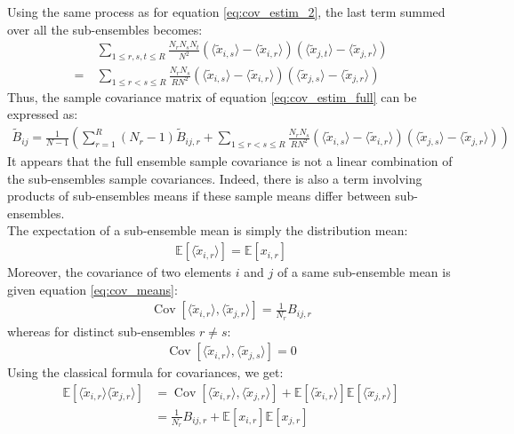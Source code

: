 \documentclass[12pt]{scrartcl}
\DeclareMathOperator{\Cov}{Cov}
\begin{document}
Using the same process as for equation \eqref{eq:cov_estim_2}, the last term summed over all the sub-ensembles becomes:
\begin{align}
& \sum_{1 \le r,s,t \le R} \frac{N_r N_s N_t}{N^2} \left(\langle \widetilde{x}_{i,s} \rangle - \langle \widetilde{x}_{i,r} \rangle \right) \left(\langle \widetilde{x}_{j,t} \rangle - \langle \widetilde{x}_{j,r} \rangle \right) \nonumber \\
= \ & \sum_{1 \le r < s \le R} \frac{N_r N_s}{R N^2} \left(\langle \widetilde{x}_{i,s} \rangle - \langle \widetilde{x}_{i,r} \rangle \right) \left(\langle \widetilde{x}_{j,s} \rangle - \langle \widetilde{x}_{j,r} \rangle \right)
\end{align}
Thus, the sample covariance matrix of equation \eqref{eq:cov_estim_full} can be expressed as:
\begin{align}
\widetilde{B}_{ij} =  \frac{1}{N-1} \left(\sum_{r=1}^R \left(N_r-1\right) \widetilde{B}_{ij,r} + \sum_{1 \le r < s \le R} \frac{N_r N_s}{R N^2} \left(\langle \widetilde{x}_{i,s} \rangle - \langle \widetilde{x}_{i,r} \rangle \right) \left(\langle \widetilde{x}_{j,s} \rangle - \langle \widetilde{x}_{j,r} \rangle \right) \right)
\end{align}
It appears that the full ensemble sample covariance is not a linear combination of the sub-ensembles sample covariances. Indeed, there is also a term involving products of sub-ensembles means if these sample means differ between sub-ensembles.\\
$  $\\
The expectation of a sub-ensemble mean is simply the distribution mean:
\begin{align}
\mathbb{E} \left[\langle \widetilde{x}_{i,r} \rangle \right] = \mathbb{E} \left[x_{i,r} \right]
\end{align}
Moreover, the covariance of two elements $i$ and $j$ of a same sub-ensemble mean is given equation \ref{eq:cov_means}:
\begin{align}
\Cov \left[\langle \widetilde{x}_{i,r} \rangle,\langle \widetilde{x}_{j,r} \rangle \right] = \frac{1}{N_r} B_{ij,r}
\end{align}
whereas for distinct sub-ensembles $r \ne s$:
\begin{align}
\Cov \left[\langle \widetilde{x}_{i,r} \rangle,\langle \widetilde{x}_{j,s} \rangle \right] = 0
\end{align}
Using the classical formula for covariances, we get:
\begin{align}
\mathbb{E} \left[\langle \widetilde{x}_{i,r} \rangle \langle \widetilde{x}_{j,r} \rangle\right] & = \Cov \left[\langle \widetilde{x}_{i,r} \rangle,\langle \widetilde{x}_{j,r} \rangle \right] + \mathbb{E} \left[\langle \widetilde{x}_{i,r} \rangle \right] \mathbb{E} \left[ \langle \widetilde{x}_{j,r} \rangle\right] \nonumber \\
& = \frac{1}{N_r} B_{ij,r} + \mathbb{E} \left[x_{i,r} \right] \mathbb{E} \left[x_{j,r} \right]
\end{align}
\end{document}
